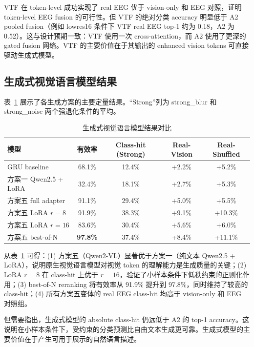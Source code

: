 VTF 在 token-level 成功实现了 real EEG 优于 vision-only 和 EEG 对照，证明 token-level EEG fusion 的可行性。但 VTF 的绝对分类 accuracy 明显低于 A2 pooled fusion（例如 lowres16 条件下 VTF real EEG top-1 约为 0.18，A2 为 0.52）。这与设计预期一致：VTF 使用一次 cross-attention，而 A2 使用了更深的 gated fusion 网络。VTF 的主要价值在于其输出的 enhanced vision tokens 可直接驱动生成式模型。

\subsection{生成式视觉语言模型结果}

表~\ref{tab:evlm-results} 展示了各生成方案的主要定量结果。``Strong''列为 strong\_blur 和 strong\_noise 两个强退化条件的平均。

\begin{table}[htbp]
  \centering
  \caption{生成式视觉语言模型结果对比}
  \label{tab:evlm-results}
  \begin{tabular}{l c c c c}
    \toprule
    模型 & 有效率 & Class-hit (Strong) & Real-Vision & Real-Shuffled \\
    \midrule
    GRU baseline & 68.1\% & 12.4\% & +2.2\% & +5.2\% \\
    方案一 Qwen2.5 + LoRA & 32.4\% & 18.1\% & +2.7\% & +5.3\% \\
    方案五 full adapter & 91.1\% & 29.4\% & +5.0\% & +5.5\% \\
    方案五 LoRA $r=8$ & 91.9\% & 38.3\% & +9.1\% & +10.3\% \\
    方案五 LoRA $r=16$ & 83.6\% & 30.4\% & +5.6\% & +6.0\% \\
    方案五 best-of-N & \textbf{97.8\%} & 37.4\% & +8.4\% & +11.1\% \\
    \bottomrule
  \end{tabular}
\end{table}

从表~\ref{tab:evlm-results} 可得：(1) 方案五（Qwen2-VL）显著优于方案一（纯文本 Qwen2.5 + LoRA），说明原生视觉语言模型对视觉 token 的理解能力是生成质量的关键；(2) LoRA $r=8$ 在 class-hit 上优于 $r=16$，验证了小样本条件下低秩约束的正则化作用；(3) best-of-N reranking 将有效率从 91.9\% 提升到 97.8\%，同时维持了较高的 class-hit；(4) 所有方案五变体的 real EEG class-hit 均高于 vision-only 和 EEG 对照组。

但需要指出，生成式模型的 absolute class-hit 仍远低于 A2 的 top-1 accuracy。这说明在小样本条件下，受约束的分类预测比自由文本生成更可靠。生成式模型的主要价值在于产生可用于展示的自然语言描述。

